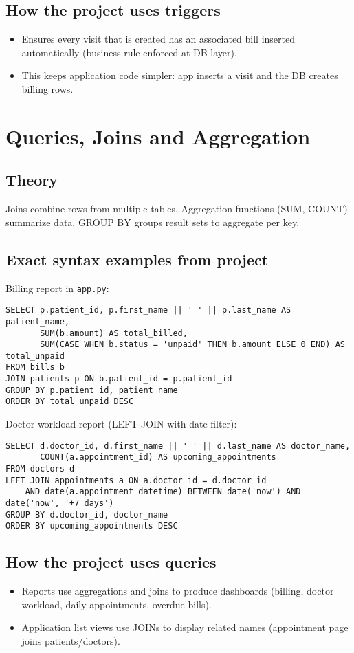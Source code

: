\documentclass[11pt,a4paper]{article}
\begin{document}
\subsection{How the project uses triggers}
\begin{itemize}
  \item Ensures every visit that is created has an associated bill inserted automatically (business rule enforced at DB layer).
  \item This keeps application code simpler: app inserts a visit and the DB creates billing rows.
\end{itemize}

\section{Queries, Joins and Aggregation}
\subsection{Theory}
Joins combine rows from multiple tables. Aggregation functions (SUM, COUNT) summarize data. GROUP BY groups result sets to aggregate per key.

\subsection{Exact syntax examples from project}
Billing report in \texttt{app.py}:
\begin{lstlisting}
SELECT p.patient_id, p.first_name || ' ' || p.last_name AS patient_name,
       SUM(b.amount) AS total_billed,
       SUM(CASE WHEN b.status = 'unpaid' THEN b.amount ELSE 0 END) AS total_unpaid
FROM bills b
JOIN patients p ON b.patient_id = p.patient_id
GROUP BY p.patient_id, patient_name
ORDER BY total_unpaid DESC
\end{lstlisting}

Doctor workload report (LEFT JOIN with date filter):
\begin{lstlisting}
SELECT d.doctor_id, d.first_name || ' ' || d.last_name AS doctor_name,
       COUNT(a.appointment_id) AS upcoming_appointments
FROM doctors d
LEFT JOIN appointments a ON a.doctor_id = d.doctor_id
    AND date(a.appointment_datetime) BETWEEN date('now') AND date('now', '+7 days')
GROUP BY d.doctor_id, doctor_name
ORDER BY upcoming_appointments DESC
\end{lstlisting}

\subsection{How the project uses queries}
\begin{itemize}
  \item Reports use aggregations and joins to produce dashboards (billing, doctor workload, daily appointments, overdue bills).
  \item Application list views use JOINs to display related names (appointment page joins patients/doctors).
\end{itemize}
\end{document}
